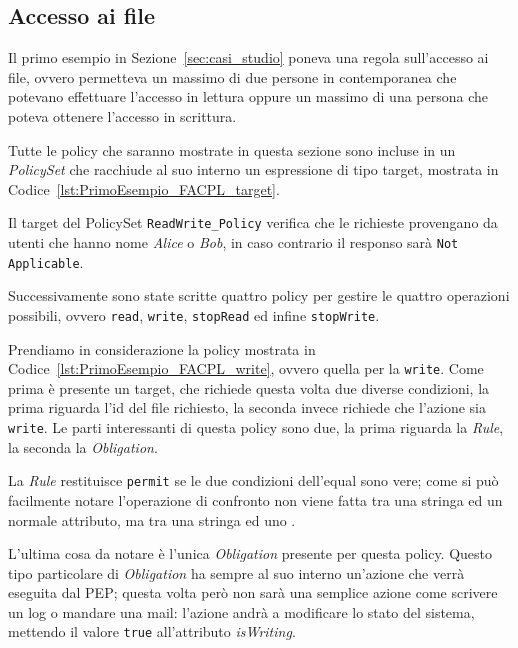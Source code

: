 \subsection{Accesso ai file} %
\label{ssub:primo_esempio}
Il primo esempio in Sezione~\ref{sec:casi_studio} poneva una regola sull'accesso ai file, ovvero permetteva un massimo di due persone in contemporanea che potevano effettuare l'accesso in lettura oppure un massimo di una persona che poteva ottenere l'accesso in scrittura. \par
Tutte le policy che saranno mostrate in questa sezione sono incluse in un \textit{PolicySet} che racchiude al suo interno un espressione di tipo target, mostrata in Codice~\ref{lst:PrimoEsempio_FACPL_target}.

Il target del PolicySet \texttt{ReadWrite\_Policy} verifica che le richieste provengano da utenti che hanno nome \textit{Alice} o \textit{Bob}, in caso contrario il responso sarà \texttt{Not Applicable}. \par
Successivamente sono state scritte quattro policy per gestire le quattro operazioni possibili, ovvero \texttt{read}, \texttt{write}, \texttt{stopRead} ed infine \texttt{stopWrite}. \par
Prendiamo in considerazione la policy mostrata in Codice~\ref{lst:PrimoEsempio_FACPL_write}, ovvero quella per la \texttt{write}. Come prima è presente un target, che richiede questa volta due diverse condizioni, la prima riguarda l'id del file richiesto, la seconda invece richiede che l'azione sia \texttt{write}. Le parti interessanti di questa policy sono due, la prima riguarda la \textit{Rule}, la seconda la \textit{Obligation}. \par
La \textit{Rule} restituisce \texttt{permit} se le due condizioni dell'equal sono vere; come si può facilmente notare l'operazione di confronto non viene fatta tra una stringa ed un normale attributo, ma tra una stringa ed uno \statusattribute. \par
L'ultima cosa da notare è l'unica \textit{Obligation} presente per questa policy. Questo tipo particolare di \textit{Obligation} ha sempre al suo interno un'azione che verrà eseguita dal PEP; questa volta però non sarà una semplice azione come scrivere un log o mandare una mail: l'azione andrà a modificare lo stato del sistema, mettendo il valore \texttt{true} all'attributo \textit{isWriting}.

